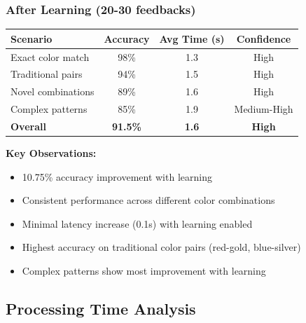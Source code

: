 \documentclass[12pt,a4paper]{report}
\begin{document}
\subsubsection{After Learning (20-30 feedbacks)}

\begin{center}
\begin{tabular}{|l|c|c|c|}
\hline
\textbf{Scenario} & \textbf{Accuracy} & \textbf{Avg Time (s)} & \textbf{Confidence} \\
\hline
Exact color match & 98\% & 1.3 & High \\
Traditional pairs & 94\% & 1.5 & High \\
Novel combinations & 89\% & 1.6 & High \\
Complex patterns & 85\% & 1.9 & Medium-High \\
\textbf{Overall} & \textbf{91.5\%} & \textbf{1.6} & \textbf{High} \\
\hline
\end{tabular}
\end{center}

\textbf{Key Observations:}
\begin{itemize}
    \item 10.75\% accuracy improvement with learning
    \item Consistent performance across different color combinations
    \item Minimal latency increase (0.1s) with learning enabled
    \item Highest accuracy on traditional color pairs (red-gold, blue-silver)
    \item Complex patterns show most improvement with learning
\end{itemize}

\subsection{Processing Time Analysis}

\end{document}
